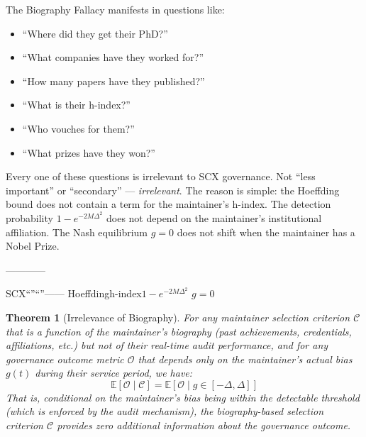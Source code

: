 \documentclass[12pt,a4paper]{article}
\newtheorem{theorem}{Theorem}[section]
\theoremstyle{remark}
\newcommand{\E}{\mathbb{E}}
\begin{document}
The Biography Fallacy manifests in questions like:
\begin{itemize}[leftmargin=*]
    \item ``Where did they get their PhD?''
    \item ``What companies have they worked for?''
    \item ``How many papers have they published?''
    \item ``What is their h-index?''
    \item ``Who vouches for them?''
    \item ``What prizes have they won?''
\end{itemize}

Every one of these questions is irrelevant to SCX governance. Not ``less
important'' or ``secondary'' — \textit{irrelevant}. The reason is simple: the
Hoeffding bound does not contain a term for the maintainer's h-index. The
detection probability $1 - e^{-2M\Delta^2}$ does not depend on the maintainer's
institutional affiliation. The Nash equilibrium $g = 0$ does not shift when the
maintainer has a Nobel Prize.

\noindent\textbf{}
————
\textbf{}

SCX“”“”——\textit{}
Hoeffdingh-index$1 - e^{-2M\Delta^2}$
$g = 0$

\begin{theorem}[Irrelevance of Biography]\label{thm:biography_irrelevant}
For any maintainer selection criterion $\mathcal{C}$ that is a function of the
maintainer's biography (past achievements, credentials, affiliations, etc.) but
not of their real-time audit performance, and for any governance outcome metric
$\mathcal{O}$ that depends only on the maintainer's actual bias $g(t)$ during
their service period, we have:
\begin{equation}
    \E[\mathcal{O} \mid \mathcal{C}] = \E[\mathcal{O} \mid g \in [-\Delta, \Delta]]
\end{equation}
That is, conditional on the maintainer's bias being within the detectable
threshold (which is enforced by the audit mechanism), the biography-based
selection criterion $\mathcal{C}$ provides zero additional information about the
governance outcome.
\end{theorem}
\end{document}

